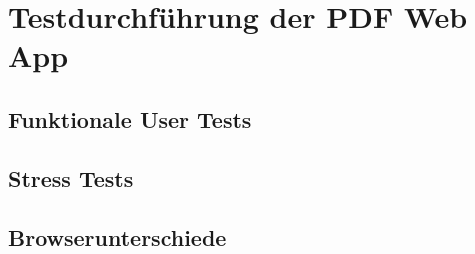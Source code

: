 \section{Testdurchführung der PDF Web App}

\subsection{Funktionale User Tests}

\subsection{Stress Tests}

\subsection{Browserunterschiede}